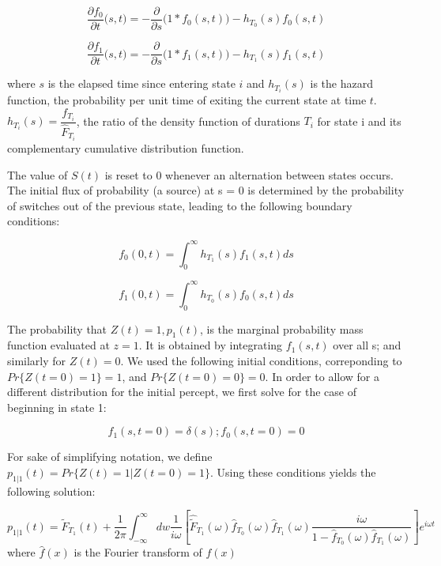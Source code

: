 \documentclass{frontiersSCNS} %
\begin{document}
\begin{equation}
\frac{\partial f_0}{\partial t} \big(s,t\big) = -\frac{\partial}{\partial s}\big(1 * f_0(s,t)\big) - h_{T_0}(s) f_0(s,t)
\end{equation}

\begin{equation}
\frac{\partial f_1}{\partial t} \big(s,t\big) = -\frac{\partial}{\partial s} \big(1 * f_1(s,t)\big) - h_{T_1}(s) f_1(s,t)
\end{equation}

where $s$ is the elapsed time since entering state $i$ and $h_{T_i}(s)$ is the hazard function, the probability per unit time of exiting the current state at time $t$. $h_{T_i}(s) = \dfrac{f_{T_i}}{\hat{F}_{T_i}}$, the ratio of the density function of durations $T_i$ for state i and its complementary cumulative distribution function.

The value of $S(t)$ is reset to 0 whenever an alternation between states occurs. The initial flux of probability (a source) at s = 0 is determined by the probability of switches out of the previous state, leading to the following boundary conditions:

\begin{equation}
f_0(0,t) = \int_0^\infty h_{T_1}(s) f_1(s,t) ds
\end{equation}

\begin{equation}
f_1(0,t) = \int_0^\infty h_{T_0}(s) f_0(s,t) ds
\end{equation}

The probability that $Z(t)=1, p_1(t)$, is the marginal probability mass function evaluated at $z=1$. It is obtained by integrating $f_1(s,t)$ over all s; and similarly for $Z(t)=0$.
We used the following initial conditions, correponding to $Pr \lbrace Z(t=0)=1 \rbrace=1$, and $Pr \lbrace Z(t=0)=0 \rbrace = 0$. In order to allow for a different distribution for the initial percept, we first solve for the case of beginning in state 1:

\begin{equation}
f_1(s,t=0) = \delta(s); f_0(s,t=0) = 0
\end{equation} 

For sake of simplifying notation, we define $p_{1|1}(t)=Pr \lbrace Z(t)=1|Z(t=0)=1 \rbrace$. Using these conditions yields the following solution:

\begin{equation}
p_{1|1}(t) = \tilde{F}_{T_1}(t) + \frac{1}{2\pi} \int_{-\infty}^\infty dw \frac{1}{i\omega} \left[ \hat{\tilde{F}}_{T_1}(\omega) \hat{f}_{T_0}(\omega)\hat{f}_{T_1}(\omega) \frac{i\omega}{1 - \hat{f}_{T_0}(\omega)\hat{f}_{T_1}(\omega)} \right] e^{i \omega t}
\end{equation}
where $\hat{f}(x)$ is the Fourier transform of $f(x)$
\end{document}
